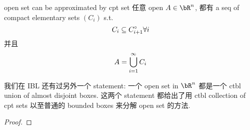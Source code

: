 \documentclass[lang=cn,11pt]{elegantbook}
\begin{document}
\begin{lemma}{open set can be approximated by cpt set}
    任意 open $A \in \bR^n$, 都有 a seq of compact elementary sets $(C_i)$ s.t. 
    $$
    C_i \subseteq C_{i+1}^{\circ} \forall i
    $$
    并且
    $$
    A = \displaystyle\bigcup_{i=1}^\infty C_i
    $$
\end{lemma}

\begin{remark}
    我们在 IBL 还有过另外一个 statement: 一个 open set in $\bR^n$ 都是一个 ctbl union of almost disjoint boxes. 这两个 statement 都给出了用 ctbl collection of cpt sets 以至普通的 bounded boxes 来分解 open set 的方法.
\end{remark}

\begin{proof}
    
\end{proof}
\end{document}
